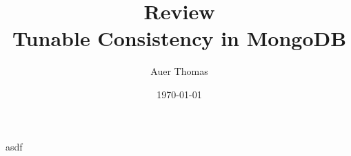 \documentclass{article}
\title{\textbf{Review}\\Tunable Consistency in MongoDB}
\author{Auer Thomas}
\date{\today}
\begin{document}
\maketitle
\horrule{1pt}

\vspace{2em}

asdf
\end{document}
